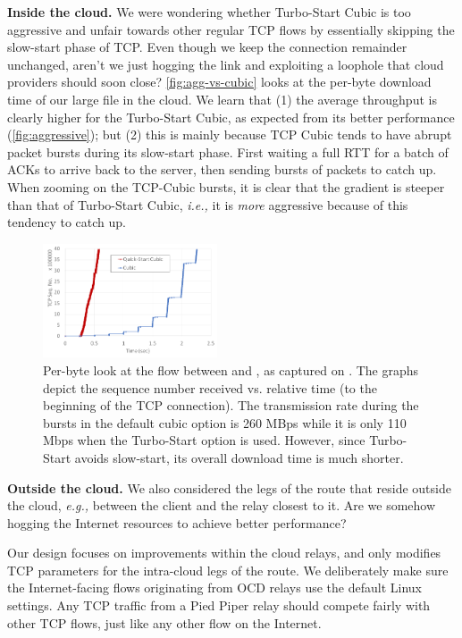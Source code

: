 \documentclass[newfonts=false,format=sigconf,10pt,letterpaper]{acmart}
\providecommand{\vs}{vs. }
\providecommand{\ie}{\emph{i.e.,} }
\providecommand{\eg}{\emph{e.g.,} }
\newcommand{\T}[1]{\smallskip\noindent\textbf{#1}} %
\newcommand{\oursys}{Pied Piper\xspace}
\begin{document}
\T{Inside the cloud.} We were wondering whether Turbo-Start Cubic is too aggressive and unfair towards other regular TCP flows by essentially skipping the slow-start phase of TCP. Even though we keep the connection remainder unchanged, aren't we just hogging the link and exploiting a loophole
that cloud providers should soon close?
\autoref{fig:agg-vs-cubic} looks at the per-byte download time of our large file in the cloud. We learn that (1) the average throughput is clearly higher for the Turbo-Start Cubic, as expected from its better performance (\autoref{fig:aggressive}); but (2) this is mainly because TCP Cubic tends to have abrupt packet bursts during its slow-start phase. First waiting a full RTT for a batch of ACKs to arrive back to the server, then sending bursts of packets to catch up. When zooming on the TCP-Cubic bursts, it is clear that the gradient is steeper than that of Turbo-Start Cubic, \ie it is \textit{more} aggressive because of this tendency to catch up. 
\begin{figure}[!t]
  \centering
    \includegraphics[width=0.46\textwidth,trim=20mm 25mm 25mm 20mm,clip]{figures/CubicVsAggressive-seq}
    \caption{Per-byte look at the flow between \rs and \rc, as captured on \rc. The graphs depict the sequence number received \vs relative time (to the beginning of the TCP connection). The transmission rate during the bursts in the default cubic option is 260 MBps while it is only 110 Mbps when the Turbo-Start option is used. However, since Turbo-Start avoids slow-start, its overall download time is much shorter.  
    }
    \label{fig:agg-vs-cubic}
\end{figure}

\T{Outside the cloud.} We also considered the legs of the route that reside outside the cloud, \eg between the client and the relay \rc closest to it. Are we somehow hogging the Internet resources to achieve better performance? 

Our design focuses on improvements within the cloud relays, and only modifies TCP parameters for the intra-cloud legs of the route. We deliberately make sure the Internet-facing flows originating from OCD relays use the default Linux settings. Any TCP traffic from a \oursys relay should compete fairly with other TCP flows, just  like any other flow on the Internet.
\end{document}
